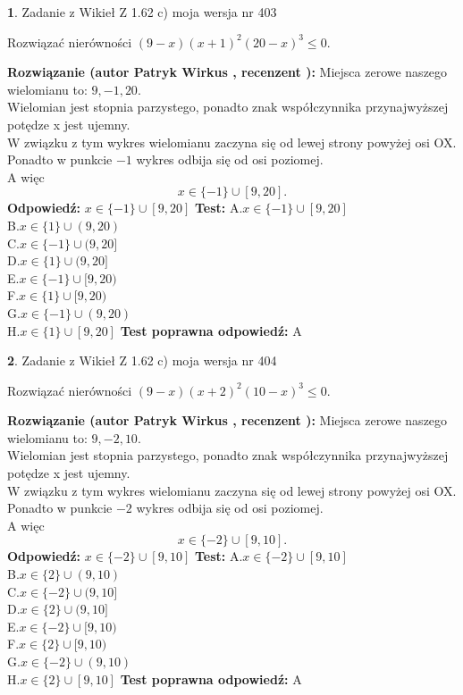 \documentclass[12pt, a4paper]{article}
\theoremstyle{definition} %
\newtheorem{zad}{}
\newcommand{\zadStart}[1]{\begin{zad}#1\newline}
\newcommand{\zadStop}{\end{zad}}
\newcommand{\rozwStart}[2]{\noindent \textbf{Rozwiązanie (autor #1 , recenzent #2): }\newline}
\newcommand{\rozwStop}{\newline}
\newcommand{\odpStart}{\noindent \textbf{Odpowiedź:}\newline}
\newcommand{\odpStop}{\newline}
\newcommand{\testStart}{\noindent \textbf{Test:}\newline}
\newcommand{\testStop}{\newline}
\newcommand{\kluczStart}{\noindent \textbf{Test poprawna odpowiedź:}\newline}
\newcommand{\kluczStop}{\newline}
\begin{document}
\zadStart{Zadanie z Wikieł Z 1.62 c) moja wersja nr 403}

Rozwiązać nierówności $(9-x)(x+1)^{2}(20-x)^{3}\le0$.
\zadStop
\rozwStart{Patryk Wirkus}{}
Miejsca zerowe naszego wielomianu to: $9, -1, 20$.\\
Wielomian jest stopnia parzystego, ponadto znak współczynnika przy\linebreak najwyższej potędze x jest ujemny.\\ W związku z tym wykres wielomianu zaczyna się od lewej strony powyżej osi OX.\\
Ponadto w punkcie $-1$ wykres odbija się od osi poziomej.\\
A więc $$x \in \{-1\} \cup [9,20].$$
\rozwStop
\odpStart
$x \in \{-1\} \cup [9,20]$
\odpStop
\testStart
A.$x \in \{-1\} \cup [9,20]$\\
B.$x \in \{1\} \cup (9,20)$\\
C.$x \in \{-1\} \cup (9,20]$\\
D.$x \in \{1\} \cup (9,20]$\\
E.$x \in \{-1\} \cup [9,20)$\\
F.$x \in \{1\} \cup [9,20)$\\
G.$x \in \{-1\} \cup (9,20)$\\
H.$x \in \{1\} \cup [9,20]$
\testStop
\kluczStart
A
\kluczStop



\zadStart{Zadanie z Wikieł Z 1.62 c) moja wersja nr 404}

Rozwiązać nierówności $(9-x)(x+2)^{2}(10-x)^{3}\le0$.
\zadStop
\rozwStart{Patryk Wirkus}{}
Miejsca zerowe naszego wielomianu to: $9, -2, 10$.\\
Wielomian jest stopnia parzystego, ponadto znak współczynnika przy\linebreak najwyższej potędze x jest ujemny.\\ W związku z tym wykres wielomianu zaczyna się od lewej strony powyżej osi OX.\\
Ponadto w punkcie $-2$ wykres odbija się od osi poziomej.\\
A więc $$x \in \{-2\} \cup [9,10].$$
\rozwStop
\odpStart
$x \in \{-2\} \cup [9,10]$
\odpStop
\testStart
A.$x \in \{-2\} \cup [9,10]$\\
B.$x \in \{2\} \cup (9,10)$\\
C.$x \in \{-2\} \cup (9,10]$\\
D.$x \in \{2\} \cup (9,10]$\\
E.$x \in \{-2\} \cup [9,10)$\\
F.$x \in \{2\} \cup [9,10)$\\
G.$x \in \{-2\} \cup (9,10)$\\
H.$x \in \{2\} \cup [9,10]$
\testStop
\kluczStart
A
\kluczStop
\end{document}
